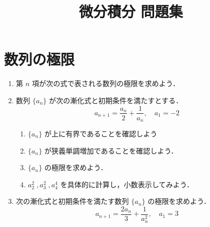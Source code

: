 \documentclass[11pt, uplatex, dvipdfmx, twoside]{jsarticle}
\title{\Huge 微分積分 問題集}
\newcommand{\ds}{\displaystyle}
\begin{document}
\maketitle
\thispagestyle{empty}

\newpage


\section{数列の極限}\label{sec:sequence}

\begin{enumerate}[label=\arabic{section}.\arabic*]
  
  \setlength{\itemsep}{1zh}
  
\item 第 $n$ 項が次の式で表される数列の極限を求めよう．

  \vspace{1zh}
  

\item 数列 $\{a_n\}$ が次の漸化式と初期条件を満たすとする．
  \[
    a_{n+1} = \frac{a_{n}}{2}+\frac{1}{a_{n}} ,\quad a_1=-2
  \]
  \begin{enumerate}[label=(\arabic*)]
    \setlength{\itemsep}{1ex}


  \item $\{a_n\}$ が上に有界であることを確認しよう
    
  \item $\{a_n\}$ が狭義単調増加であることを確認しよう．

  \item $\{a_n\}$ の極限を求めよう．

  \item $a_2^2\; , a_3^2\; , a_4^4$ を具体的に計算し，小数表示してみよう．
  \end{enumerate}

\item 次の漸化式と初期条件を満たす数列 $\{a_n\}$ の極限を求めよう．
  \[
    a_{n+1} = \frac{2a_{n}}{3} + \frac{1}{a_{n}^2}, \quad a_1 = 3
  \]
\end{enumerate}
\end{document}
